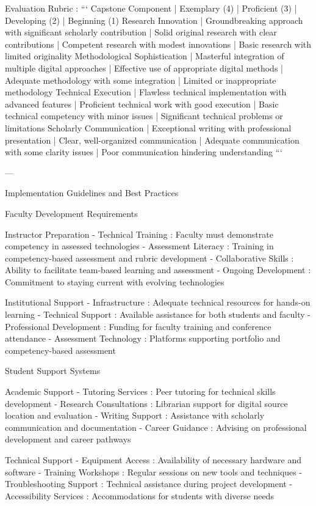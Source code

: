 \begin{appendices}
 Evaluation Rubric :
```
Capstone Component | Exemplary (4) | Proficient (3) | Developing (2) | Beginning (1)
Research Innovation | Groundbreaking approach with significant scholarly contribution | Solid original research with clear contributions | Competent research with modest innovations | Basic research with limited originality
Methodological Sophistication | Masterful integration of multiple digital approaches | Effective use of appropriate digital methods | Adequate methodology with some integration | Limited or inappropriate methodology
Technical Execution | Flawless technical implementation with advanced features | Proficient technical work with good execution | Basic technical competency with minor issues | Significant technical problems or limitations
Scholarly Communication | Exceptional writing with professional presentation | Clear, well-organized communication | Adequate communication with some clarity issues | Poor communication hindering understanding
```

---

   Implementation Guidelines and Best Practices

    Faculty Development Requirements

     Instructor Preparation
-  Technical Training : Faculty must demonstrate competency in assessed technologies
-  Assessment Literacy : Training in competency-based assessment and rubric development
-  Collaborative Skills : Ability to facilitate team-based learning and assessment
-  Ongoing Development : Commitment to staying current with evolving technologies

     Institutional Support
-  Infrastructure : Adequate technical resources for hands-on learning
-  Technical Support : Available assistance for both students and faculty
-  Professional Development : Funding for faculty training and conference attendance
-  Assessment Technology : Platforms supporting portfolio and competency-based assessment

    Student Support Systems

     Academic Support
-  Tutoring Services : Peer tutoring for technical skills development
-  Research Consultations : Librarian support for digital source location and evaluation
-  Writing Support : Assistance with scholarly communication and documentation
-  Career Guidance : Advising on professional development and career pathways

     Technical Support
-  Equipment Access : Availability of necessary hardware and software
-  Training Workshops : Regular sessions on new tools and techniques
-  Troubleshooting Support : Technical assistance during project development
-  Accessibility Services : Accommodations for students with diverse needs


\end{appendices}
